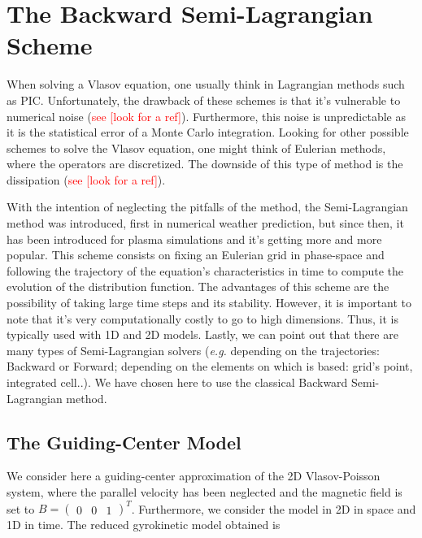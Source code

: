 \documentclass[proc]{edpsmath}
\begin{document}
\section{The Backward Semi-Lagrangian Scheme}
\label{sec:BSL_scheme}

When solving a Vlasov equation, one usually think in Lagrangian methods such as PIC. Unfortunately, the drawback of these schemes is that it's vulnerable to numerical noise (\textcolor{red}{see [look for a ref]}). Furthermore, this noise is unpredictable as it is the statistical error of a Monte Carlo integration. Looking for other possible schemes to solve the Vlasov equation, one might think of Eulerian methods, where the operators 
are discretized. The downside of this type of method is the dissipation (\textcolor{red}{see [look for a ref]}).

With the intention of neglecting the pitfalls of the method, the Semi-Lagrangian method was introduced, first in numerical weather prediction, but since then, it has been introduced for plasma simulations \cite{sonnendrucker:inria-00073296, Cheng1976330} and it's getting more and more popular. This scheme consists on fixing an Eulerian grid in phase-space and following the trajectory of the equation's characteristics in time to compute the evolution of the distribution function. The advantages of this scheme are the possibility of taking large time steps and its stability. However, it is important to note that it's very computationally costly to go to high dimensions. Thus, it is typically used with 1D and 2D models. Lastly, we can point out that there are many types of Semi-Lagrangian solvers (\emph{e.g.} depending on the trajectories: Backward or Forward;  depending on the elements on which is based: grid's point, integrated cell..). We have chosen here to use the classical Backward Semi-Lagrangian method. 

\subsection{The Guiding-Center Model}
We consider here a guiding-center approximation of the 2D Vlasov-Poisson system, where the parallel velocity has been neglected and the magnetic field is set to $B = \begin{pmatrix} 0 & 0 & 1 \end{pmatrix}^T$. Furthermore, we consider the model in 2D in space and 1D in time. The reduced gyrokinetic model obtained\cite{filbet:hal-01068223} is
\end{document}
